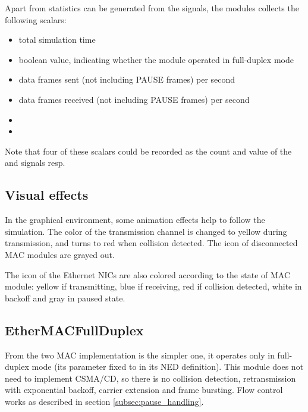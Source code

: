 
Apart from statistics can be generated from the signals, the modules collects
the following scalars:

\begin{itemize}
  \item {} total simulation time
  \item {} boolean value, indicating whether the module operated
          in full-duplex mode
  \item {} data frames sent (not including PAUSE frames) per second
  \item {} data frames received (not including PAUSE frames) per second
  \item {}
  \item {}
\end{itemize}

Note that four of these scalars could be recorded as the count and value of the 
and  signals resp.

\subsection*{Visual effects}

In the graphical environment, some animation effects help to follow the simulation.
The color of the transmission channel is changed to yellow during transmission, and
turns to red when collision detected. The icon of disconnected MAC modules are grayed out.

The icon of the Ethernet NICs are also colored according to the state of MAC module:
yellow if transmitting, blue if receiving, red if collision detected, white in backoff
and gray in paused state.




\subsection{EtherMACFullDuplex}

From the two MAC implementation  is the simpler one,
it operates only in full-duplex mode (its  parameter fixed to
 in its NED definition). This module does not need to implement
CSMA/CD, so there is no collision detection, retransmission with exponential backoff,
carrier extension and frame bursting. Flow control works as described in section
\ref{subsec:pause_handling}.

